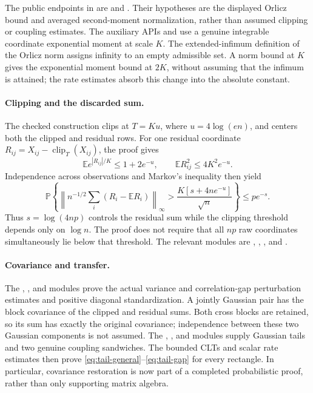 \documentclass[11pt]{article}
\newcommand{\E}{\mathbb E}
\newcommand{\Prob}{\mathbb P}
\begin{document}
The public endpoints in  are
 and
. Their hypotheses are the displayed
Orlicz bound and averaged second-moment normalization, rather than
assumed clipping or coupling estimates. The auxiliary APIs
 and  use a
genuine integrable coordinate exponential moment at scale $K$.
The extended-infimum definition of the Orlicz norm assigns infinity to
an empty admissible set. A norm bound at $K$ gives the exponential
moment bound at $2K$, without assuming that the infimum is attained;
the rate estimates absorb this change into the absolute constant.

\paragraph{Clipping and the discarded sum.}
The checked construction clips at $T=Ku$, where $u=4\log(en)$, and
centers both the clipped and residual rows. For one residual coordinate
$R_{ij}=X_{ij}-\operatorname{clip}_T(X_{ij})$, the proof gives
\[
 \E e^{|R_{ij}|/K}\le1+2e^{-u},\qquad
 \E R_{ij}^2\le4K^2e^{-u}.
\]
Independence across observations and Markov's inequality then yield
\[
 \Prob\!\left\{\left\|n^{-1/2}\sum_i(R_i-\E R_i)\right\|_\infty
       >\frac{K[s+4ne^{-u}]}{\sqrt n}\right\}\le pe^{-s}.
\]
Thus $s=\log(4np)$ controls the residual sum while the clipping
threshold depends only on $\log n$. The proof does not require that
all $np$ raw coordinates simultaneously lie below that threshold.
The relevant modules are ,
, , and
.

\paragraph{Covariance and transfer.}
The , , and
 modules prove the actual variance and
correlation-gap perturbation estimates and positive diagonal
standardization. A jointly Gaussian pair has the block covariance of
the clipped and residual sums. Both cross blocks are retained, so its
sum has exactly the original covariance; independence between these two
Gaussian components is not assumed. The ,
, and 
modules supply Gaussian tails and two genuine coupling sandwiches.
The bounded CLTs and scalar rate estimates then prove
\eqref{eq:tail-general}--\eqref{eq:tail-gap} for every rectangle.
In particular, covariance restoration is now part of a completed
probabilistic proof, rather than only supporting matrix algebra.
\end{document}
